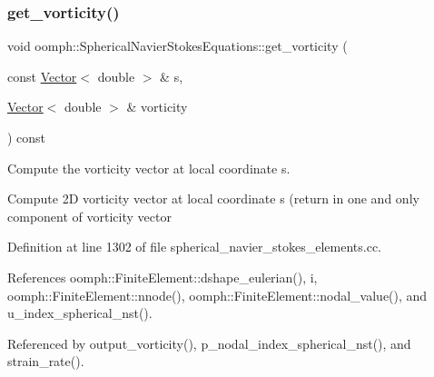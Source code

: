 \mbox{\label{classoomph_1_1SphericalNavierStokesEquations_a0ef3334439b336f5ec21c7cd223e05f9}} 
\subsubsection{\texorpdfstring{get\+\_\+vorticity()}{get\_vorticity()}}
{\footnotesize\ttfamily void oomph\+::\+Spherical\+Navier\+Stokes\+Equations\+::get\+\_\+vorticity (\begin{DoxyParamCaption}\item[{const \hyperlink{classoomph_1_1Vector}{Vector}$<$ double $>$ \&}]{s,  }\item[{\hyperlink{classoomph_1_1Vector}{Vector}$<$ double $>$ \&}]{vorticity }\end{DoxyParamCaption}) const}



Compute the vorticity vector at local coordinate s. 

Compute 2D vorticity vector at local coordinate s (return in one and only component of vorticity vector 

Definition at line 1302 of file spherical\+\_\+navier\+\_\+stokes\+\_\+elements.\+cc.



References oomph\+::\+Finite\+Element\+::dshape\+\_\+eulerian(), i, oomph\+::\+Finite\+Element\+::nnode(), oomph\+::\+Finite\+Element\+::nodal\+\_\+value(), and u\+\_\+index\+\_\+spherical\+\_\+nst().



Referenced by output\+\_\+vorticity(), p\+\_\+nodal\+\_\+index\+\_\+spherical\+\_\+nst(), and strain\+\_\+rate().

\mbox{\label{classoomph_1_1SphericalNavierStokesEquations_a103fc06bfd3cad9f5511686e5e5d1ce9}} 
